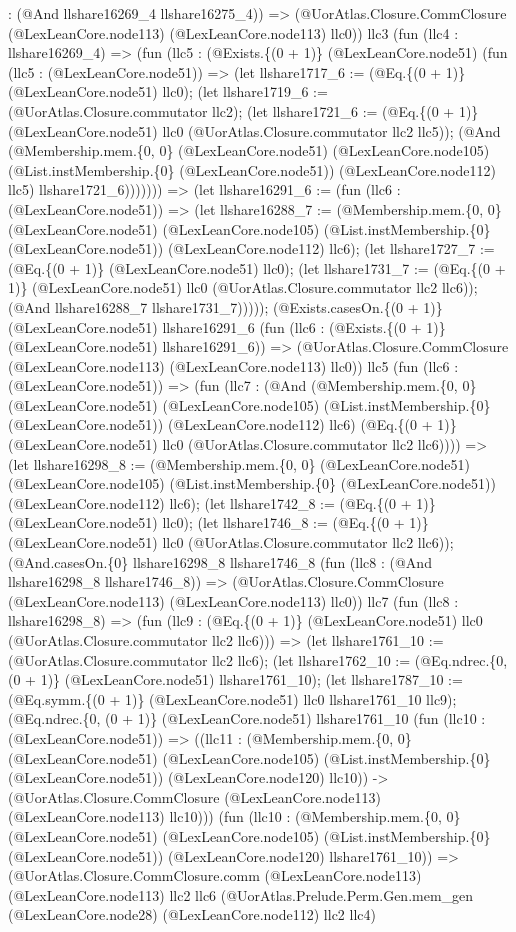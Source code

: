 \documentclass[11pt]{article}
\begin{document}
: (@And llshare16269\_4 llshare16275\_4)) => (@UorAtlas.Closure.CommClosure (@LexLeanCore.node113) (@LexLeanCore.node113) llc0)) llc3 (fun (llc4 : llshare16269\_4) => (fun (llc5 : (@Exists.\{(0 + 1)\} (@LexLeanCore.node51) (fun (llc5 : (@LexLeanCore.node51)) => (let llshare1717\_6 := (@Eq.\{(0 + 1)\} (@LexLeanCore.node51) llc0); (let llshare1719\_6 := (@UorAtlas.Closure.commutator llc2); (let llshare1721\_6 := (@Eq.\{(0 + 1)\} (@LexLeanCore.node51) llc0 (@UorAtlas.Closure.commutator llc2 llc5)); (@And (@Membership.mem.\{0, 0\} (@LexLeanCore.node51) (@LexLeanCore.node105) (@List.instMembership.\{0\} (@LexLeanCore.node51)) (@LexLeanCore.node112) llc5) llshare1721\_6))))))) => (let llshare16291\_6 := (fun (llc6 : (@LexLeanCore.node51)) => (let llshare16288\_7 := (@Membership.mem.\{0, 0\} (@LexLeanCore.node51) (@LexLeanCore.node105) (@List.instMembership.\{0\} (@LexLeanCore.node51)) (@LexLeanCore.node112) llc6); (let llshare1727\_7 := (@Eq.\{(0 + 1)\} (@LexLeanCore.node51) llc0); (let llshare1731\_7 := (@Eq.\{(0 + 1)\} (@LexLeanCore.node51) llc0 (@UorAtlas.Closure.commutator llc2 llc6)); (@And llshare16288\_7 llshare1731\_7))))); (@Exists.casesOn.\{(0 + 1)\} (@LexLeanCore.node51) llshare16291\_6 (fun (llc6 : (@Exists.\{(0 + 1)\} (@LexLeanCore.node51) llshare16291\_6)) => (@UorAtlas.Closure.CommClosure (@LexLeanCore.node113) (@LexLeanCore.node113) llc0)) llc5 (fun (llc6 : (@LexLeanCore.node51)) => (fun (llc7 : (@And (@Membership.mem.\{0, 0\} (@LexLeanCore.node51) (@LexLeanCore.node105) (@List.instMembership.\{0\} (@LexLeanCore.node51)) (@LexLeanCore.node112) llc6) (@Eq.\{(0 + 1)\} (@LexLeanCore.node51) llc0 (@UorAtlas.Closure.commutator llc2 llc6)))) => (let llshare16298\_8 := (@Membership.mem.\{0, 0\} (@LexLeanCore.node51) (@LexLeanCore.node105) (@List.instMembership.\{0\} (@LexLeanCore.node51)) (@LexLeanCore.node112) llc6); (let llshare1742\_8 := (@Eq.\{(0 + 1)\} (@LexLeanCore.node51) llc0); (let llshare1746\_8 := (@Eq.\{(0 + 1)\} (@LexLeanCore.node51) llc0 (@UorAtlas.Closure.commutator llc2 llc6)); (@And.casesOn.\{0\} llshare16298\_8 llshare1746\_8 (fun (llc8 : (@And llshare16298\_8 llshare1746\_8)) => (@UorAtlas.Closure.CommClosure (@LexLeanCore.node113) (@LexLeanCore.node113) llc0)) llc7 (fun (llc8 : llshare16298\_8) => (fun (llc9 : (@Eq.\{(0 + 1)\} (@LexLeanCore.node51) llc0 (@UorAtlas.Closure.commutator llc2 llc6))) => (let llshare1761\_10 := (@UorAtlas.Closure.commutator llc2 llc6); (let llshare1762\_10 := (@Eq.ndrec.\{0, (0 + 1)\} (@LexLeanCore.node51) llshare1761\_10); (let llshare1787\_10 := (@Eq.symm.\{(0 + 1)\} (@LexLeanCore.node51) llc0 llshare1761\_10 llc9); (@Eq.ndrec.\{0, (0 + 1)\} (@LexLeanCore.node51) llshare1761\_10 (fun (llc10 : (@LexLeanCore.node51)) => ((llc11 : (@Membership.mem.\{0, 0\} (@LexLeanCore.node51) (@LexLeanCore.node105) (@List.instMembership.\{0\} (@LexLeanCore.node51)) (@LexLeanCore.node120) llc10)) -> (@UorAtlas.Closure.CommClosure (@LexLeanCore.node113) (@LexLeanCore.node113) llc10))) (fun (llc10 : (@Membership.mem.\{0, 0\} (@LexLeanCore.node51) (@LexLeanCore.node105) (@List.instMembership.\{0\} (@LexLeanCore.node51)) (@LexLeanCore.node120) llshare1761\_10)) => (@UorAtlas.Closure.CommClosure.comm (@LexLeanCore.node113) (@LexLeanCore.node113) llc2 llc6 (@UorAtlas.Prelude.Perm.Gen.mem\_gen (@LexLeanCore.node28) (@LexLeanCore.node112) llc2 llc4) 
\end{document}
